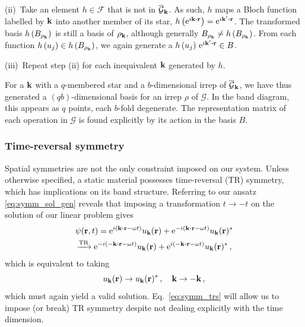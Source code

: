 (ii)~Take an element $h \in \mathcal{F}$ that is not in ${\overline{\mathcal{G}}}_{\vb{k}}$. As such, $h$ maps a Bloch function labelled by $\vb{k}$ into another member of its star, $h \left(\e^{i \vb{k}\vdot\vb{r}}\right) = \e^{i \vb{k}'\vdot\vb{r}}$. The transformed basis $h \left( B_{\rho_{\vb{k}}}\right)$ is still a basis of $\rho_{\vb{k}}$, although generally ${B_{\rho_{\vb{k}}}} \neq h \left( B_{\rho_{\vb{k}}}\right)$. From each function $h  \left(u_j\right) \in h \left( {B_{\rho_{\vb{k}}}}\right)$, we again generate a $h  \left(u_j\right)\, \e^{i \vb{k}'\vdot\vb{r}} \in B$.

(iii)~Repeat step (ii) for each inequivalent $\vb{k}$ generated by $h$. 

For a $\vb{k}$ with a $q$-membered star and a $b$-dimensional irrep of ${\overline{\mathcal{G}}}_{\vb{k}}$, we have thus generated a $(qb)$-dimensional basis for an irrep $\rho$ of $\mathcal{G}$. In the band diagram, this appears as $q$ points, each $b$-fold degenerate. The representation matrix of each operation in $\mathcal{G}$ is found explicitly by its action in the basis $B$.


\subsubsection{Time-reversal symmetry}

Spatial symmetries are not the only constraint imposed on our system. Unless otherwise specified, a static material possesses time-reversal (TR) symmetry, which has implications on its band structure. Referring to our ansatz \eqref{eq:symm_sol_gen} reveals that imposing a transformation $t \rightarrow -t$ on the solution of our linear problem gives
\begin{equation}
\begin{gathered}
\psi(\vb{r}, t) = \e^{i \left( \vb{k} \vdot \vb{r} - \omega t \right)} u_{\vb{k}}(\vb{r}) + \e^{-i \left( \vb{k} \vdot \vb{r} - \omega t \right)} u_{\vb{k}}(\vb{r})^* \\
\xrightarrow{\text{TR}} \e^{-i \left( -\vb{k} \vdot \vb{r} - \omega t \right)} u_{\vb{k}}(\vb{r}) + \e^{i \left( -\vb{k} \vdot \vb{r} - \omega t \right)} u_{\vb{k}}(\vb{r})^* \,,
\end{gathered}
\end{equation}
which is equivalent to taking
\begin{equation} \label{eq:symm_trs}
u_{\vb{k}}(\vb{r}) \rightarrow u_{\vb{k}}(\vb{r})^* \,, \quad \vb{k} \rightarrow -\vb{k} \,,
\end{equation}
which must again yield a valid solution. Eq.~\eqref{eq:symm_trs} will allow us to impose (or break) TR symmetry despite not dealing explicitly with the time dimension. 

